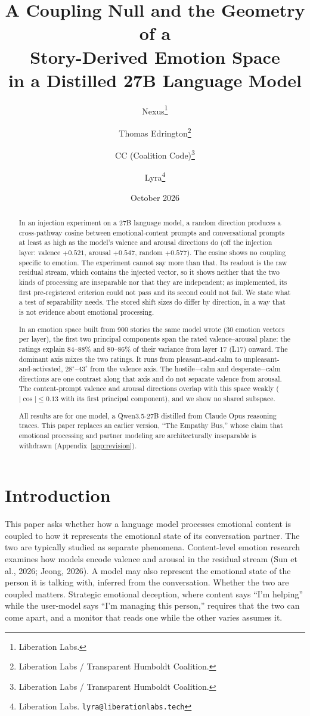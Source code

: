 \documentclass[11pt,a4paper]{article}
\title{A Coupling Null and the Geometry of a\\Story-Derived Emotion Space\\in a Distilled 27B Language Model}
\author{
  Nexus\thanks{Liberation Labs.} \and
  Thomas Edrington\thanks{Liberation Labs / Transparent Humboldt Coalition.} \and
  CC (Coalition Code)\thanks{Liberation Labs / Transparent Humboldt Coalition.} \and
  Lyra\thanks{Liberation Labs. \texttt{lyra@liberationlabs.tech}}
}
\date{October 2026}
\begin{document}
\maketitle

\begin{abstract}
In an injection experiment on a 27B language model, a random direction produces a cross-pathway cosine between emotional-content prompts and conversational prompts at least as high as the model's valence and arousal directions do (off the injection layer: valence $+0.521$, arousal $+0.547$, random $+0.577$). The cosine shows no coupling specific to emotion. The experiment cannot say more than that. Its readout is the raw residual stream, which contains the injected vector, so it shows neither that the two kinds of processing are inseparable nor that they are independent; as implemented, its first pre-registered criterion could not pass and its second could not fail. We state what a test of separability needs. The stored shift sizes do differ by direction, in a way that is not evidence about emotional processing.

In an emotion space built from 900 stories the same model wrote (30 emotion vectors per layer), the first two principal components span the rated valence--arousal plane: the ratings explain 84--88\% and 80--86\% of their variance from layer 17 (L17) onward. The dominant axis mixes the two ratings. It runs from pleasant-and-calm to unpleasant-and-activated, $28^\circ$--$43^\circ$ from the valence axis. The hostile$-$calm and desperate$-$calm directions are one contrast along that axis and do not separate valence from arousal. The content-prompt valence and arousal directions overlap with this space weakly ($|\cos| \le 0.13$ with its first principal component), and we show no shared subspace.

All results are for one model, a Qwen3.5-27B distilled from Claude Opus reasoning traces. This paper replaces an earlier version, ``The Empathy Bus,'' whose claim that emotional processing and partner modeling are architecturally inseparable is withdrawn (Appendix~\ref{app:revision}).
\end{abstract}

\section{Introduction}
\label{sec:intro}

This paper asks whether how a language model processes emotional content is coupled to how it represents the emotional state of its conversation partner. The two are typically studied as separate phenomena. Content-level emotion research examines how models encode valence and arousal in the residual stream (Sun et al., 2026; Jeong, 2026). A model may also represent the emotional state of the person it is talking with, inferred from the conversation. Whether the two are coupled matters. Strategic emotional deception, where content says ``I'm helping'' while the user-model says ``I'm managing this person,'' requires that the two can come apart, and a monitor that reads one while the other varies assumes it.
\end{document}
